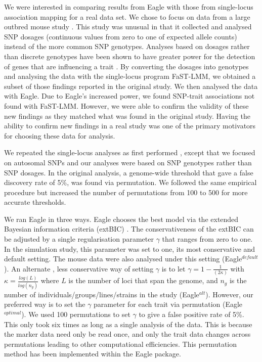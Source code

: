 \documentclass{article}
\begin{document}
We were interested in comparing results from Eagle with those from single-locus association mapping for a real data set.
 We chose to focus on data from a large outbred mouse study \citep{nicod2016genome}. This study was unusual in that it collected and analysed SNP dosages (continuous values from zero to one of expected allele counts)  instead of the more common SNP genotypes. Analyses based on dosages rather than discrete genotypes have been shown to have greater power for the detection of genes that are influencing a trait  \citep{zheng2011comparison}. By converting the dosages into genotypes and analysing the data with the single-locus program FaST-LMM, we obtained a subset of those findings reported in the original study. We then analysed the data with Eagle. Due to Eagle's increased power, we found SNP-trait associations not found with  FaST-LMM. However, we were 
 able to confirm the validity of these new findings as they matched what was found in the original study. Having the ability to confirm new findings  in a real study was 
 one of the primary motivators for choosing these data for analysis. 

We repeated the single-locus analyses as first performed \citep{nicod2016genome}, except 
that we focused on autosomal SNPs and our analyses were based on SNP genotypes  rather than SNP dosages. 
In the original analysis, a genome-wide threshold that gave a false discovery rate of 5\%, was found via permutation. We followed the 
same empirical procedure but increased the number of permutations from 100 to 500 for more accurate thresholds.  


We ran Eagle in three ways. 
Eagle chooses the best model via the extended Bayesian information criteria (extBIC) \citep{chen2008extended}. 
  The conservativeness of the extBIC can be adjusted by a single regularisation parameter  $\gamma$ that ranges from zero to one. 
In the simulation study, this parameter was set to one, its most conservative and default setting. The mouse data were also analysed 
under this setting (Eagle$^{default}$).  An alternate  \citep{chen2008extended} , less conservative way of setting $\gamma$ is to  let $\gamma = 1 - \frac{1}{(2\kappa)}$ with $\kappa=\frac{log(L)}{log(n_g)}$ where 
 $L$ is the number of loci that span the genome, and $n_g$ is the number of individuals/groups/lines/strains in the study
  (Eagle$^{alt}$). However, our preferred way is to set the $\gamma$ parameter for each trait via permutation (Eagle$^{optimal}$).  We used 100 permutations to set $\gamma$ to give a false  positive rate of 5\%.  This only took six times as long as a single analysis of the data. This is because the marker data need only be read  once, 
 and only the trait data changes across permutations leading to other computational efficiencies.  
  This permutation method has been implemented within the
 Eagle package. 
  
\end{document}
